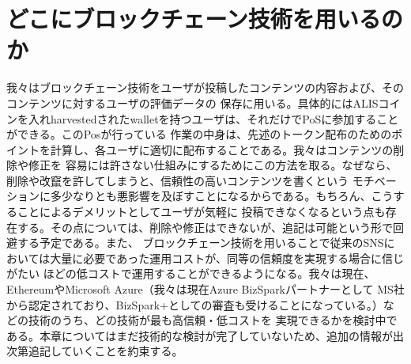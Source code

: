 \documentclass{jsarticle}
\begin{document}
\section{どこにブロックチェーン技術を用いるのか}
我々はブロックチェーン技術をユーザが投稿したコンテンツの内容および、そのコンテンツに対するユーザの評価データの
保存に用いる。具体的にはALISコインを入れharvestedされたwalletを持つユーザは、それだけでPoSに参加することができる。このPosが行っている
作業の中身は、先述のトークン配布のためのポイントを計算し、各ユーザに適切に配布することである。我々はコンテンツの削除や修正を
容易には許さない仕組みにするためにこの方法を取る。なぜなら、削除や改竄を許してしまうと、信頼性の高いコンテンツを書くという
モチベーションに多少なりとも悪影響を及ぼすことになるからである。もちろん、こうすることによるデメリットとしてユーザが気軽に
投稿できなくなるという点も存在する。その点については、削除や修正はできないが、追記は可能という形で回避する予定である。また、
ブロックチェーン技術を用いることで従来のSNSにおいては大量に必要であった運用コストが、同等の信頼度を実現する場合に信じがたい
ほどの低コストで運用することができるようになる。我々は現在、EthereumやMicrosoft Azure（我々は現在Azure BizSparkパートナーとして
MS社から認定されており、BizSpark+としての審査も受けることになっている。）などの技術のうち、どの技術が最も高信頼・低コストを
実現できるかを検討中である。本章についてはまだ技術的な検討が完了していないため、追加の情報が出次第追記していくことを約束する。
\end{document}
